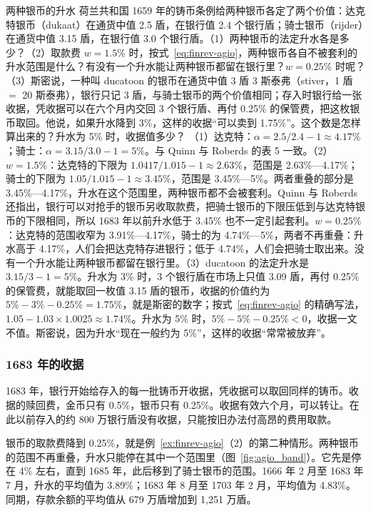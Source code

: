 \begin{example}{两种银币的升水}\label{ex:finrev-agio}
荷兰共和国 1659 年的铸币条例给两种银币各定了两个价值：达克特银币（dukaat）在通货中值 2.5 盾，在银行值 2.4 个银行盾；骑士银币（rijder）在通货中值 3.15 盾，在银行值 3.0 个银行盾\cite{qr2010}。（1）两种银币的法定升水各是多少？（2）取款费 $w=1.5\%$ 时，按式~\eqref{eq:finrev-agio}，两种银币各自不被套利的升水范围是什么？有没有一个升水能让两种银币都留在银行里？$w=0.25\%$ 时呢？（3）斯密说，一种叫 ducatoon 的银币在通货中值 3 盾 3 斯泰弗（stiver，1 盾 $=$ 20 斯泰弗），银行只记 3 盾，与骑士银币的两个价值相同；存入时银行给一张收据，凭收据可以在六个月内交回 3 个银行盾、再付 0.25\% 的保管费，把这枚银币取回。他说，如果升水降到 3\%，这样的收据“可以卖到 1.75\%”\cite{smith1776}。这个数是怎样算出来的？升水为 5\% 时，收据值多少？
\solution （1）达克特：$\alpha=2.5/2.4-1\approx4.17\%$；骑士：$\alpha=3.15/3.0-1=5\%$。与 Quinn 与 Roberds 的表 5 一致\cite{qr2010}。（2）$w=1.5\%$：达克特的下限为 $1.0417/1.015-1\approx2.63\%$，范围是 2.63\%—4.17\%；骑士的下限为 $1.05/1.015-1\approx3.45\%$，范围是 3.45\%—5\%。两者重叠的部分是 3.45\%—4.17\%，升水在这个范围里，两种银币都不会被套利。Quinn 与 Roberds 还指出，银行可以对抢手的银币另收取款费，把骑士银币的下限压低到与达克特银币的下限相同，所以 1683 年以前升水低于 3.45\% 也不一定引起套利\cite{qr2010}。$w=0.25\%$：达克特的范围收窄为 3.91\%—4.17\%，骑士的为 4.74\%—5\%，两者不再重叠：升水高于 4.17\%，人们会把达克特存进银行；低于 4.74\%，人们会把骑士取出来。没有一个升水能让两种银币都留在银行里。（3）ducatoon 的法定升水是 $3.15/3-1=5\%$。升水为 3\% 时，3 个银行盾在市场上只值 3.09 盾，再付 0.25\% 的保管费，就能取回一枚值 3.15 盾的银币，收据的价值约为 $5\%-3\%-0.25\%=1.75\%$，就是斯密的数字；按式~\eqref{eq:finrev-agio} 的精确写法，$1.05-1.03\times1.0025\approx1.74\%$。升水为 5\% 时，$5\%-5\%-0.25\%<0$，收据一文不值。斯密说，因为升水“现在一般约为 5\%”，这样的收据“常常被放弃”\cite{smith1776}。
\end{example}

\subsubsection{1683 年的收据}
1683 年，银行开始给存入的每一批铸币开收据，凭收据可以取回同样的铸币。收据的赎回费，金币只有 0.5\%，银币只有 0.25\%。收据有效六个月，可以转让\cite{qr2010}。在此以前存入的约 800 万银行盾没有收据，只能按旧办法付高昂的费用取款\cite{qr2010}。

银币的取款费降到 0.25\%，就是例~\ref{ex:finrev-agio}（2）的第二种情形。两种银币的范围不再重叠，升水只能停在其中一个范围里（图~\ref{fig:agio_band}）。它先是停在 4\% 左右，直到 1685 年，此后移到了骑士银币的范围。1666 年 2 月至 1683 年 7 月，升水的平均值为 3.89\%；1683 年 8 月至 1703 年 2 月，平均值为 4.83\%。同期，存款余额的平均值从 679 万盾增加到 1,251 万盾\cite{qr2010}。


